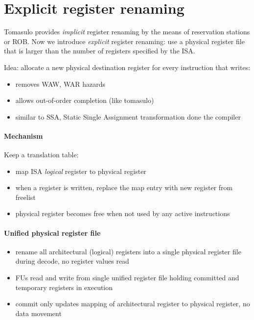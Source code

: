 
\section{Explicit register renaming}\label{sec:register-renaming}
Tomasulo provides \textit{implicit} register renaming by the means of reservation stations or ROB\@.
Now we introduce \textit{explicit} register renaming: use a physical register file that is larger than the number of
registers specified by the ISA\@.

Idea: allocate a new physical destination register for every instruction that writes:
\begin{itemize}[noitemsep]
    \item removes WAW, WAR hazards
    \item allows out-of-order completion (like tomasulo)
    \item similar to SSA, Static Single Assignment transformation done the compiler
\end{itemize}

\paragraph{Mechanism} Keep a translation table:
\begin{itemize}[noitemsep]
    \item map ISA \textit{logical} register to physical register
    \item when a register is written, replace the map entry with new register from freelist
    \item physical register becomes free when not used by any active instructions
\end{itemize}

\paragraph{Unified physical register file}
\begin{itemize}
    \item rename all architectural (logical) registers into a single physical register file during decode, no register
    values read
    \item FUs read and write from single unified register file holding committed and temporary registers in execution
    \item commit only updates mapping of architectural register to physical register, no data movement
\end{itemize}


